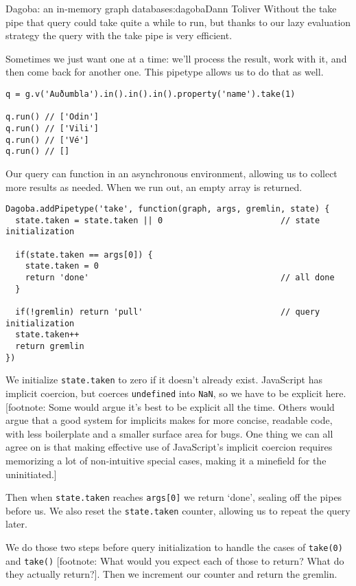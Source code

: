 \begin{aosachapter}{Dagoba: an in-memory graph database}{s:dagoba}{Dann Toliver}
Without the take pipe that query could take quite a while to run, but
thanks to our lazy evaluation strategy the query with the take pipe is
very efficient.

Sometimes we just want one at a time: we'll process the result, work
with it, and then come back for another one. This pipetype allows us to
do that as well.

\begin{verbatim}
q = g.v('Auðumbla').in().in().in().property('name').take(1)

q.run() // ['Odin']
q.run() // ['Vili']
q.run() // ['Vé']
q.run() // []
\end{verbatim}

Our query can function in an asynchronous environment, allowing us to
collect more results as needed. When we run out, an empty array is
returned.

\begin{verbatim}
Dagoba.addPipetype('take', function(graph, args, gremlin, state) {
  state.taken = state.taken || 0                        // state initialization
  
  if(state.taken == args[0]) {
    state.taken = 0
    return 'done'                                       // all done
  }
  
  if(!gremlin) return 'pull'                            // query initialization
  state.taken++
  return gremlin
})
\end{verbatim}

We initialize \texttt{state.taken} to zero if it doesn't already exist.
JavaScript has implicit coercion, but coerces \texttt{undefined} into
\texttt{NaN}, so we have to be explicit here. {[}footnote: Some would
argue it's best to be explicit all the time. Others would argue that a
good system for implicits makes for more concise, readable code, with
less boilerplate and a smaller surface area for bugs. One thing we can
all agree on is that making effective use of JavaScript's implicit
coercion requires memorizing a lot of non-intuitive special cases,
making it a minefield for the uninitiated.{]}

Then when \texttt{state.taken} reaches \texttt{args{[}0{]}} we return
`done', sealing off the pipes before us. We also reset the
\texttt{state.taken} counter, allowing us to repeat the query later.

We do those two steps before query initialization to handle the cases of
\texttt{take(0)} and \texttt{take()} {[}footnote: What would you expect
each of those to return? What do they actually return?{]}. Then we
increment our counter and return the gremlin.


\end{aosachapter}
